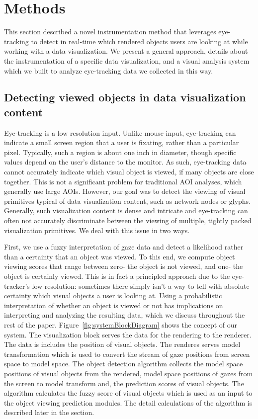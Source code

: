 \section{Methods}\label{sec:Methods}
This section described a novel instrumentation method that leverages eye-tracking to detect in real-time which rendered objects users are looking at while working with a data visualization.  We present a general approach, details about the instrumentation of a specific data visualization, and a visual analysis system which we built to analyze eye-tracking data we collected in this way. 

\subsection{Detecting viewed objects in data visualization content}
Eye-tracking is a low resolution input. Unlike mouse input, eye-tracking can indicate a small screen region that a user is fixating, rather than a particular pixel. Typically, such a region is about one inch in diameter, though specific values depend on the user's distance to the monitor. As such, eye-tracking data cannot accurately indicate which visual object is viewed, if many objects are close together. This is not a significant problem for traditional AOI analyses, which generally use large AOIs. However, our goal was to detect the viewing of visual primitives typical of data visualization content, such as network nodes or glyphs. Generally, such visualization content is dense and intricate and eye-tracking can often not accurately discriminate between the viewing of multiple, tightly packed visualization primitives. We deal with this issue in two ways. 

First, we use a fuzzy interpretation of gaze data and detect a likelihood rather than a certainty that an object was viewed. To this end, we compute object viewing scores that range between zero- the object is not viewed, and one- the object is certainly viewed.  This is in fact a principled approach due to the eye-tracker's low resolution: sometimes there simply isn't a way to tell with absolute certainty which visual objects a user is looking at. Using a probabilistic interpretation of whether an object is viewed or not has implications on interpreting and analyzing the resulting data, which we discuss throughout the rest of the paper. Figure~\ref{fig:systemBlockDiagram} shows the concept of our system. The visualization block serves the data for the rendering to the renderer. The data is includes the position of visual objects. The renderes serves model transformation which is used to convert the stream of gaze positions from screen space to model space. The object detection algorithm collects the model space positions of visual objects from the rendered, model space positions of gazes from the screen to model transform and, the prediction scores of visual objects. The algorithm calculates the fuzzy score of visual objects which is used as an input to the object viewing prediction modules. The detail calculations of the algorithm is described later in the section.

